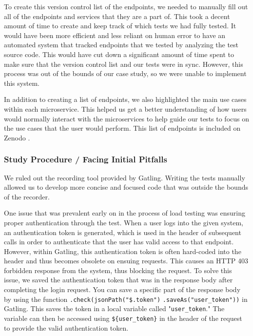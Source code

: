 To create this version control list of the endpoints, we needed to manually fill out all of the endpoints and services that they are a part of. This took a decent amount of time to create and keep track of which tests we had fully tested. It would have been more efficient and less reliant on human error to have an automated system that tracked endpoints that we tested by analyzing the test source code. This would have cut down a significant amount of time spent to make sure that the version control list and our tests were in sync. However, this process was out of the bounds of our case study, so we were unable to implement this system.

In addition to creating a list of endpoints, we also highlighted the main use cases within each microservice. This helped us get a better understanding of how users would normally interact with the microservices to help guide our tests to focus on the use cases that the user would perform. This list of endpoints is included on Zenodo \cite{zenodo_benchmark}.

\subsubsection{Study Procedure / Facing Initial Pitfalls}

We ruled out the recording tool provided by Gatling. Writing the tests manually allowed us to develop more concise and focused code that was outside the bounds of the recorder.

One issue that was prevalent early on in the process of load testing was ensuring proper authentication through the test. When a user logs into the given system, an authentication token is generated, which is used in the header of subsequent calls in order to authenticate that the user has valid access to that endpoint. However, within Gatling, this authentication token is often hard-coded into the header and thus becomes obsolete on ensuing requests. This causes an HTTP 403 forbidden response from the system, thus blocking the request. To solve this issue, we saved the authentication token that was in the response body after completing the login request. You can save a specific part of the response body by using the function \texttt{.check(jsonPath("\$.token")} \texttt{.saveAs("user\_token"))} in Gatling. This saves the token in a local variable called "\texttt{user\_token}." The variable can then be accessed using  \texttt{\$\{user\_token\}} in the header of the request to provide the valid authentication token.

